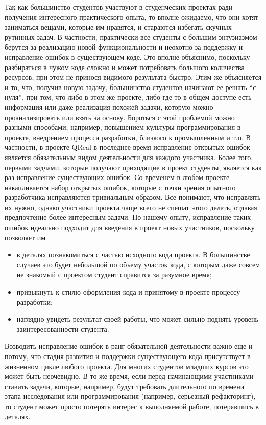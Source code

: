 \documentclass[a4paper]{article}
\begin{document}
Так как большинство студентов участвуют в студенческих проектах ради получения интересного практического опыта, то вполне ожидаемо, что они хотят заниматься вещами, которые им нравятся, и стараются избегать скучных рутинных задач. В частности, практически все студенты  с большим энтузиазмом берутся за реализацию новой функциональности и неохотно за поддержку и исправление ошибок в существующем коде. Это вполне объяснимо, поскольку разбираться в чужом коде сложно и может потребовать большого количества ресурсов, при этом не принося видимого результата быстро. Этим же объясняется и то, что, получив новую задачу, большинство студентов начинают ее решать “с нуля”, при том, что либо в этом же проекте, либо где-то в общем доступе есть информация или даже реализация похожей задачи, которую можно проанализировать или взять за основу. Бороться с этой проблемой можно разными способами, например, повышением культуры программирования в проекте, внедрением процесса разработки, близкого к промышленным и т.п. В частности, в проекте QReal в последнее время исправление открытых ошибок является обязательным видом деятельности для каждого участника. Более того, первыми задчами, которые получают приходящие в проект студенты, является как раз исправление существующих ошибок. Со временем в любом проекте накапливается набор открытых ошибок, которые с точки зрения опытного разработчика исправляются тривиальным образом. Все понимают, что исправлять их нужно, однако участники проекта чаще всего не спешат этого делать, отдавая предпочтение более интересным задачи. По нашему опыту, исправление таких ошибок идеально подходит для введения в проект новых участников, поскольку позволяет им
\begin{itemize}
 \item в деталях познакомиться с частью исходного кода проекта. В большинстве случаев это будет небольшой по объему участок кода, с которым даже совсем не знакомый с проектом студент справится за разумное время;
 \item привыкнуть к стилю оформления кода и принятому в проекте процессу разработки;
 \item наглядно увидеть результат своей работы, что может сильно поднять уровень заинтересованности студента.
\end{itemize}
Возводить исправление ошибок в ранг обязательной деятельности важно еще и потому, что стадия развития и поддержки существующего кода присутствует в жизненном цикле любого проекта. Для многих студентов младших курсов это может быть неочевидно. В то же время, если перед начинающими участниками ставить задачи, которые, например, будут требовать длительного по времени этапа исследования или программирования (например, серьезный рефакторинг), то студент может просто потерять интерес к выполняемой работе, потерявшись в деталях.
\end{document}
